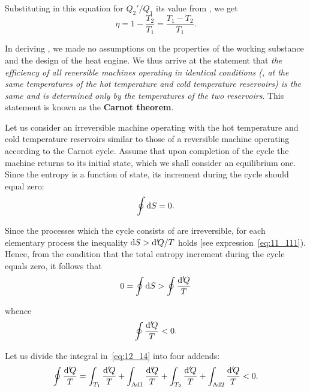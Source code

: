 \noindent
Substituting in this equation for $Q_2'/Q_1$ its value from , we get
\begin{equation}\label{eq:12_13}
	\eta = 1 - \frac{T_2}{T_1} = \frac{T_1 - T_2}{T_1}.
\end{equation}

In deriving , we made no assumptions on the properties of the working substance and the design of the heat engine. We thus arrive at the statement that \textit{the efficiency of all reversible machines operating in identical conditions (\ie, at the same temperatures of the hot temperature and cold temperature reservoirs) is the same and is determined only by the temperatures of the two reservoirs}. This statement is known as the \textbf{Carnot theorem}.

Let us consider an irreversible machine operating with the hot temperature and cold temperature reservoirs similar to those of a reversible machine operating according to the Carnot cycle. Assume that upon completion of the cycle the machine returns to its initial state, which we shall consider an equilibrium one. Since the entropy is a function of state, its increment during the cycle should equal zero:
\begin{equation*}
	\oint \mathrm{d} S = 0.
\end{equation*}

Since the processes which the cycle consists of are irreversible, for each elementary process the inequality $\mathrm{d} S>\mathrm{d}'\!Q/T$ holds [see expression~\eqref{eq:11_111}). Hence, from the condition that the total entropy increment during the cycle equals zero, it follows that
\begin{equation*}
	0 = \oint \mathrm{d} S > \oint \frac{\mathrm{d}'\!Q}{T}
\end{equation*}

\noindent
whence
\begin{equation}\label{eq:12_14}
	\oint \frac{\mathrm{d}'\!Q}{T} < 0.
\end{equation}

\noindent
Let us divide the integral in~\eqref{eq:12_14} into four addends:
\begin{equation}\label{eq:12_15}
	\oint \frac{\mathrm{d}'\!Q}{T} = \int_{T_1} \frac{\mathrm{d}'\!Q}{T} + \int_{\text{Ad}1} \frac{\mathrm{d}'\!Q}{T} + \int_{T_2} \frac{\mathrm{d}'\!Q}{T} + \int_{\text{Ad}2} \frac{\mathrm{d}'\!Q}{T} < 0.
\end{equation}

